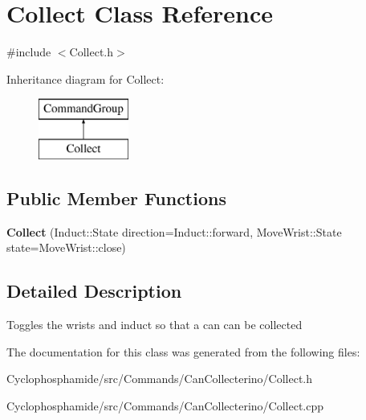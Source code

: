\hypertarget{class_collect}{}\section{Collect Class Reference}
\label{class_collect}


{\ttfamily \#include $<$Collect.\+h$>$}

Inheritance diagram for Collect\+:\begin{figure}[H]
\begin{center}
\leavevmode
\includegraphics[height=2.000000cm]{class_collect}
\end{center}
\end{figure}
\subsection*{Public Member Functions}
\begin{DoxyCompactItemize}
\item 
\hypertarget{class_collect_a2c5b2bb92dd92765c4f83e37da5eb510}{}{\bfseries Collect} (Induct\+::\+State direction=Induct\+::forward, Move\+Wrist\+::\+State state=Move\+Wrist\+::close)\label{class_collect_a2c5b2bb92dd92765c4f83e37da5eb510}

\end{DoxyCompactItemize}


\subsection{Detailed Description}
Toggles the wrists and induct so that a can can be collected 

The documentation for this class was generated from the following files\+:\begin{DoxyCompactItemize}
\item 
Cyclophosphamide/src/\+Commands/\+Can\+Collecterino/Collect.\+h\item 
Cyclophosphamide/src/\+Commands/\+Can\+Collecterino/Collect.\+cpp\end{DoxyCompactItemize}
